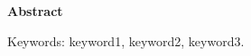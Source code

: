 {}
\begin{center}
  {\bfseries\chinnesesize Abstract}
\end{center}



\noindent Keywords: keyword1, keyword2, keyword3.
\clearpage
